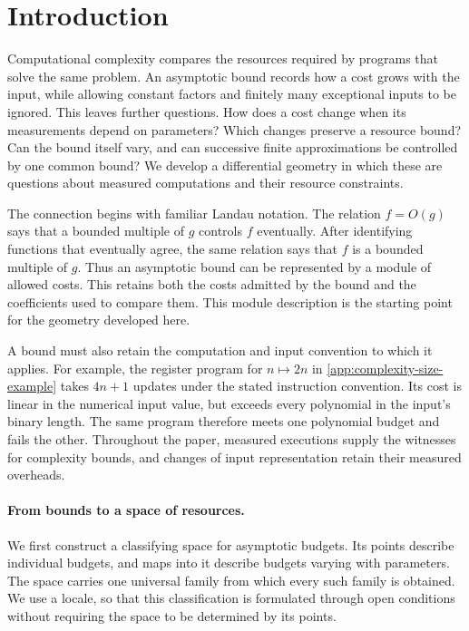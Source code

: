 \documentclass[11pt,a4paper]{article}
\numberwithin{algorithm}{section}
\numberwithin{equation}{section}
\theoremstyle{definition}
\theoremstyle{remark}
\theoremstyle{plain}
\theoremstyle{definition}
\theoremstyle{plain}
\begin{document}
\tableofcontents

\section*{Introduction}
Computational complexity compares the resources required by programs
that solve the same problem. An asymptotic bound records how a cost
grows with the input, while allowing constant factors and finitely many
exceptional inputs to be ignored. This leaves further questions. How
does a cost change when its measurements depend on parameters? Which
changes preserve a resource bound? Can the bound itself vary, and can
successive finite approximations be controlled by one common bound?
We develop a differential geometry in which these are questions about
measured computations and their resource constraints.

The connection begins with familiar Landau notation. The relation
$f=O(g)$ says that a bounded multiple of $g$ controls $f$ eventually.
After identifying functions that eventually agree, the same relation
says that $f$ is a bounded multiple of $g$. Thus an asymptotic bound
can be represented by a module of allowed costs. This retains both
the costs admitted by the bound and the coefficients used to compare
them. This module description is the starting point for the geometry
developed here.

A bound must also retain the computation and input convention to which
it applies. For example, the register program for $n\mapsto2n$ in
\cref{app:complexity-size-example} takes $4n+1$ updates under the
stated instruction convention. Its cost is linear in the numerical
input value, but exceeds every polynomial in the input's binary length.
The same program therefore meets one polynomial budget and fails the
other. Throughout the paper, measured executions supply the witnesses
for complexity bounds, and changes of input representation retain
their measured overheads.

\paragraph{From bounds to a space of resources.}
We first construct a classifying space for asymptotic budgets. Its
points describe individual budgets, and maps into it describe budgets
varying with parameters. The space carries one universal family from
which every such family is obtained. We use a locale, so that this
classification is formulated through open conditions without requiring
the space to be determined by its points.
\end{document}
